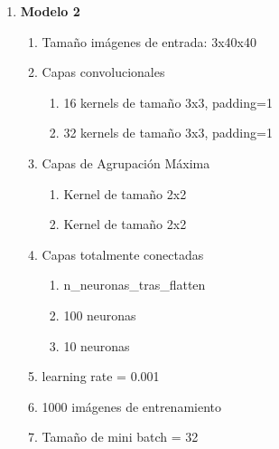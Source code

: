 \begin{enumerate}
	\item \textbf{Modelo 2}
	\begin{enumerate}[label=\textbullet, nosep]
		\item Tamaño imágenes de entrada: 3x40x40
		\item Capas convolucionales
		\begin{enumerate}[label=\textbullet, nosep]
			\item 16 kernels de tamaño 3x3, padding=1
			\item 32 kernels de tamaño 3x3, padding=1
		\end{enumerate}
		\item Capas de Agrupación Máxima
		\begin{enumerate}[label=\textbullet, nosep]
			\item Kernel de tamaño 2x2
			\item Kernel de tamaño 2x2
		\end{enumerate}
		\item Capas totalmente conectadas
		\begin{enumerate}[label=\textbullet, nosep]
			\item n\_neuronas\_tras\_flatten
			\item 100 neuronas
			\item 10 neuronas
		\end{enumerate}
		\item learning rate = 0.001
		\item 1000 imágenes de entrenamiento
		\item Tamaño de mini batch = 32
	\end{enumerate}
	

\end{enumerate}
